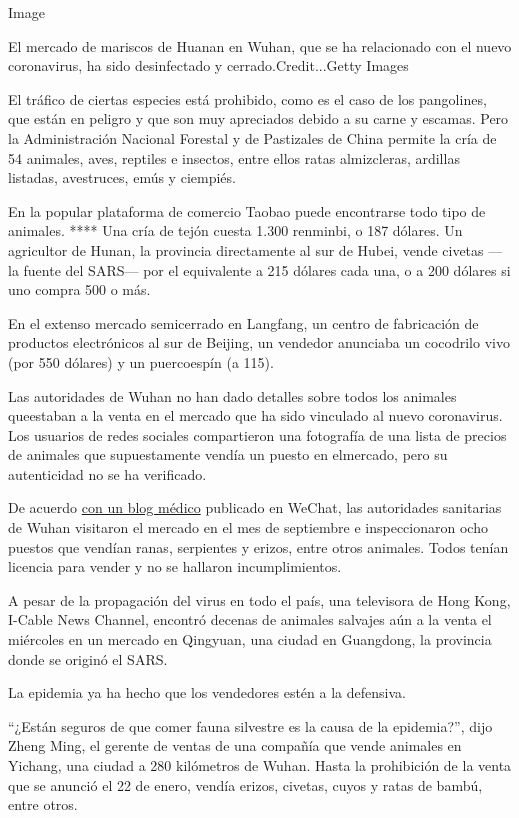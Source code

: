 Image

El mercado de mariscos de Huanan en Wuhan, que se ha relacionado con el
nuevo coronavirus, ha sido desinfectado y cerrado.Credit...Getty Images

El tráfico de ciertas especies está prohibido, como es el caso de los
pangolines, que están en peligro y que son muy apreciados debido a su
carne y escamas. Pero la Administración Nacional Forestal y de
Pastizales de China permite la cría de 54 animales, aves, reptiles e
insectos, entre ellos ratas almizcleras, ardillas listadas, avestruces,
emús y ciempiés.

En la popular plataforma de comercio Taobao puede encontrarse todo tipo
de animales. **** Una cría de tejón cuesta 1.300 renminbi, o 187
dólares. Un agricultor de Hunan, la provincia directamente al sur de
Hubei, vende civetas ---la fuente del SARS--- por el equivalente a 215
dólares cada una, o a 200 dólares si uno compra 500 o más.

En el extenso mercado semicerrado en Langfang, un centro de fabricación
de productos electrónicos al sur de Beijing, un vendedor anunciaba un
cocodrilo vivo (por 550 dólares) y un puercoespín (a 115).

Las autoridades de Wuhan no han dado detalles sobre todos los animales
queestaban a la venta en el mercado que ha sido vinculado al nuevo
coronavirus. Los usuarios de redes sociales compartieron una fotografía
de una lista de precios de animales que supuestamente vendía un puesto
en elmercado, pero su autenticidad no se ha verificado.

De acuerdo \href{https://mp.weixin.qq.com/s/_ZgkquIlUYnix2y7WmKPew}{con
un blog médico} publicado en WeChat, las autoridades sanitarias de Wuhan
visitaron el mercado en el mes de septiembre e inspeccionaron ocho
puestos que vendían ranas, serpientes y erizos, entre otros animales.
Todos tenían licencia para vender y no se hallaron incumplimientos.

A pesar de la propagación del virus en todo el país, una televisora de
Hong Kong, I-Cable News Channel, encontró decenas de animales salvajes
aún a la venta el miércoles en un mercado en Qingyuan, una ciudad en
Guangdong, la provincia donde se originó el SARS.

La epidemia ya ha hecho que los vendedores estén a la defensiva.

``¿Están seguros de que comer fauna silvestre es la causa de la
epidemia?'', dijo Zheng Ming, el gerente de ventas de una compañía que
vende animales en Yichang, una ciudad a 280 kilómetros de Wuhan. Hasta
la prohibición de la venta que se anunció el 22 de enero, vendía erizos,
civetas, cuyos y ratas de bambú, entre otros.

